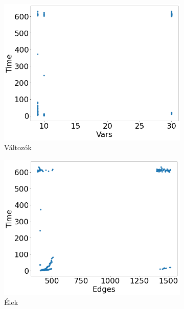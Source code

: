 \begin{figure}[ht] 
	\begin{subfigure}[b]{0.5\linewidth}
		\centering
		\includegraphics[width=0.95\linewidth]{figures/eca/vars.png} 
		\caption{Változók} 
		\label{fig7:a} 
		\vspace{4ex}
	\end{subfigure}%
	\begin{subfigure}[b]{0.5\linewidth}
		\centering
		\includegraphics[width=0.95\linewidth]{figures/eca/edges.png} 
		\caption{Élek} 
		\label{fig7:b} 
		\vspace{4ex}
	\end{subfigure} 
	\begin{subfigure}[b]{0.5\linewidth}
		\centering

\end{subfigure}
\end{figure}
